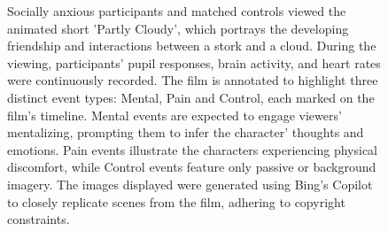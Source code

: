 \begin{figure}[!ht]
	\centering
	\caption{Socially anxious participants and matched controls viewed the animated short 'Partly Cloudy', which portrays the developing friendship and interactions between a stork and a cloud. During the viewing, participants' pupil responses, brain activity, and heart rates were continuously recorded. The film is annotated to highlight three distinct event types: Mental, Pain and Control, each marked on the film's timeline. Mental events are expected to engage viewers' mentalizing, prompting them to infer the character' thoughts and emotions. Pain events illustrate the characters experiencing physical discomfort, while Control events feature only passive or background imagery. The images displayed were generated using Bing's Copilot to closely replicate scenes from the film, adhering to copyright constraints.}
    \vspace*{-10pt}
	\label{fig:task-fig}
\end{figure}

